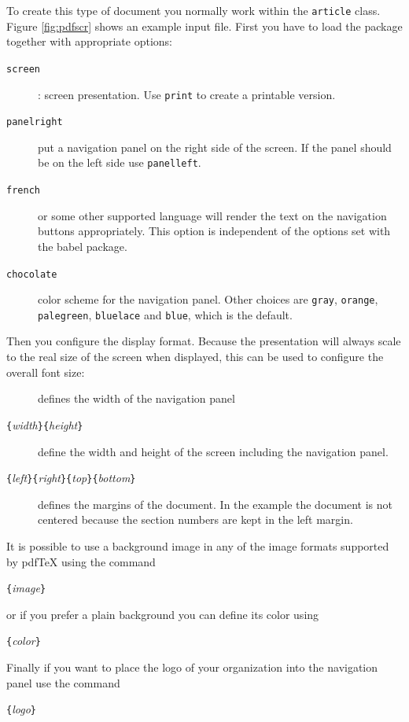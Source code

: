 To create this type of document you normally work within the
\texttt{article} class. Figure \ref{fig:pdfscr} shows an example input file.
First you have to load the  package together with
appropriate options:
\begin{description}
\item[\texttt{screen}]: screen presentation. Use \texttt{print} to
  create a printable version.
\item[\texttt{panelright}] put a navigation panel on the right side of
  the screen. If the panel should be on the left side use
  \texttt{panelleft}.
\item[\texttt{french}] or some other supported language will render
  the text on the navigation buttons appropriately. This option is
  independent of the options set with the babel package.
\item[\texttt{chocolate}] color scheme for the navigation panel. Other
  choices are \texttt{gray}, \texttt{orange}, \texttt{palegreen},
 \texttt{bluelace} and \texttt{blue}, which is the default.
\end{description}
Then you configure the display format. Because the presentation will
always scale to the real size of the screen when displayed, this can
be used to configure the overall font size:
\begin{description}
\item[] defines the width of the navigation panel
\item[\texttt{\{}\emph{width}\texttt{\}\{}\emph{height}\texttt{\}}]
  define the width and height of the screen including the navigation
  panel.
\item[\texttt{\{}\emph{left}\texttt{\}\{}\emph{right}\texttt{\}\{}\emph{top}\texttt{\}\{}\emph{bottom}\texttt{\}}]
  defines the margins of the document. In the example the document is
  not centered because the section numbers are kept in the left
  margin.
\end{description}

It is possible to use a background image in any of the image formats
supported by pdf\TeX{} using the command
\begin{lscommand}
\verb|{|\emph{image}\verb|}|
\end{lscommand}
or if you prefer a plain background you can define its color using
\begin{lscommand}
\verb|{|\emph{color}\verb|}|
\end{lscommand}
Finally if you want to place the logo of your organization into the
navigation panel use the command
\begin{lscommand}
\verb|{|\emph{logo}\verb|}|
\end{lscommand}

